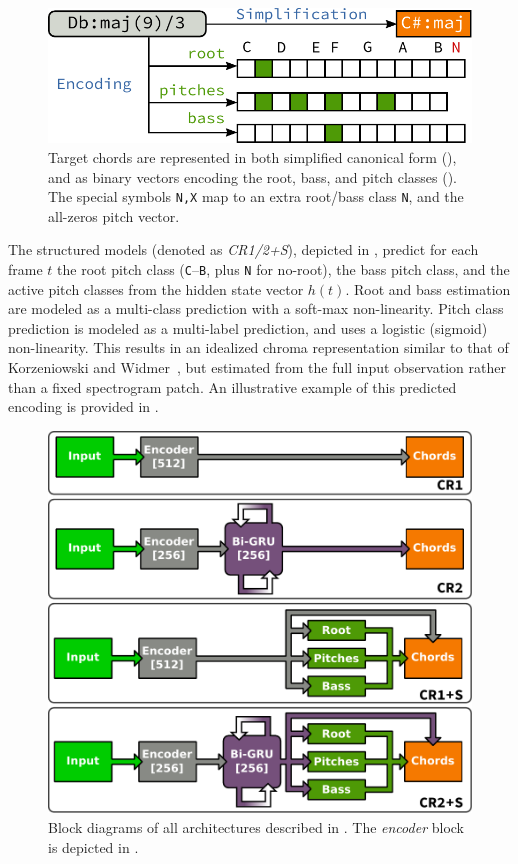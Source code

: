 \documentclass{article}
\begin{document}
\begin{figure}[t]
    \centering
    \includegraphics[width=0.9\columnwidth]{encoding}
    \caption{Target chords are represented in both simplified canonical form (), and as binary vectors encoding the root, bass, and pitch classes ().
    The special symbols \texttt{N,X} map to an extra root/bass class \texttt{N}, and the all-zeros pitch vector.\label{fig:encoding}}
\end{figure}

The structured models (denoted as \emph{CR1/2+S}), depicted in , predict for each frame $t$ the root pitch class (\texttt{C}--\texttt{B}, plus \texttt{N} for no-root), the bass pitch class, and the active pitch classes from the hidden state vector $h(t)$.
Root and bass estimation are modeled as a multi-class prediction with a soft-max non-linearity.
Pitch class prediction is modeled as a multi-label prediction, and uses a logistic (sigmoid) non-linearity.
This results in an idealized chroma representation similar to that of Korzeniowski and Widmer~\cite{korzeniowski2016feature}, but estimated from the full input observation rather than a fixed spectrogram patch.
An illustrative example of this predicted encoding is provided in .

\begin{figure}[t]
    \centering
    \includegraphics[width=0.8\columnwidth]{architectures}
    \caption{Block diagrams of all architectures described in .
    The \emph{encoder} block is depicted in .\label{fig:architectures}}
\end{figure}
\end{document}
